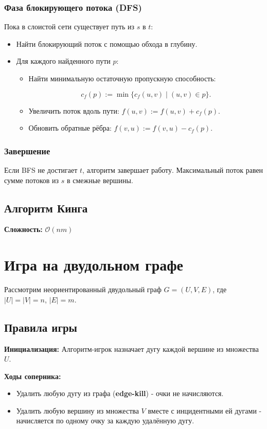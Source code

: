{\subsubsection*{Фаза блокирующего потока (DFS)}
Пока в слоистой сети существует путь из $s$ в $t$:
\begin{itemize}
  \item Найти блокирующий поток с помощью обхода в глубину.
  \item Для каждого найденного пути $p$:
  \begin{itemize}
    \item Найти минимальную остаточную пропускную способность:
    

\[
    c_f(p) := \min\{c_f(u, v) \mid (u, v) \in p\}.
    \]


    \item Увеличить поток вдоль пути: $f(u, v) := f(u, v) + c_f(p)$.
    \item Обновить обратные рёбра: $f(v, u) := f(v, u) - c_f(p)$.
  \end{itemize}
\end{itemize}

\subsubsection*{Завершение}
Если BFS не достигает $t$, алгоритм завершает работу.  
Максимальный поток равен сумме потоков из $s$ в смежные вершины.

\subsection*{Алгоритм Кинга}

\textbf{Сложность:} $\mathcal{O}(nm)$

\section*{Игра на двудольном графе}

Рассмотрим неориентированный двудольный граф $G = (U, V, E)$, где $|U| = |V| = n$, $|E| = m$.

\subsection*{Правила игры}

\textbf{Инициализация:}  
Алгоритм-игрок назначает дугу каждой вершине из множества $U$.

\textbf{Ходы соперника:}
\begin{itemize}
  \item Удалить любую дугу из графа (\textbf{edge-kill}) - очки не начисляются.
  \item Удалить любую вершину из множества $V$ вместе с инцидентными ей дугами - начисляется по одному очку за каждую удалённую дугу.
\end{itemize}

}
